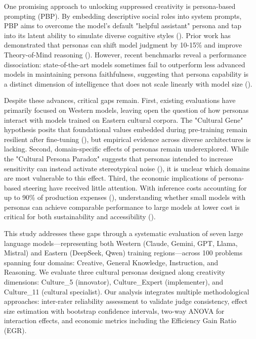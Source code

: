 \documentclass{article}
\begin{document}
One promising approach to unlocking suppressed creativity is persona-based prompting (PBP). By embedding descriptive social roles into system prompts, PBP aims to overcome the model's default "helpful assistant" persona and tap into its latent ability to simulate diverse cognitive styles (\cite{christina_lu_520bd0ae,jing_yang_699d9c2c}). Prior work has demonstrated that personas can shift model judgment by 10-15\% and improve Theory-of-Mind reasoning (\cite{tiancheng_hu_49571f40,gerard_yeo_2544df62}). However, recent benchmarks reveal a performance dissociation: state-of-the-art models sometimes fail to outperform less advanced models in maintaining persona faithfulness, suggesting that persona capability is a distinct dimension of intelligence that does not scale linearly with model size (\cite{vinay_samuel_301ec4c0}).

Despite these advances, critical gaps remain. First, existing evaluations have primarily focused on Western models, leaving open the question of how personas interact with models trained on Eastern cultural corpora. The "Cultural Gene" hypothesis posits that foundational values embedded during pre-training remain resilient after fine-tuning (\cite{emanuel_z__fenech_borg_a4a3e300}), but empirical evidence across diverse architectures is lacking. Second, domain-specific effects of personas remain underexplored. While the "Cultural Persona Paradox" suggests that personas intended to increase sensitivity can instead activate stereotypical noise (\cite{mahammed_kamruzzaman_a0ec385e, kharchenkoHowWellLLMs2024}), it is unclear which domains are most vulnerable to this effect. Third, the economic implications of persona-based steering have received little attention. With inference costs accounting for up to 90\% of production expenses (\cite{francisco_dur_n_a28bb68b}), understanding whether small models with personas can achieve comparable performance to large models at lower cost is critical for both sustainability and accessibility (\cite{anuj_kumar_1c38e9e4, jennifer_haase_36a334aa}).

This study addresses these gaps through a systematic evaluation of seven large language models—representing both Western (Claude, Gemini, GPT, Llama, Mistral) and Eastern (DeepSeek, Qwen) training regions—across 100 problems spanning four domains: Creative, General Knowledge, Instruction, and Reasoning. We evaluate three cultural personas designed along creativity dimensions: Culture\_5 (innovator), Culture\_Expert (implementer), and Culture\_11 (cultural specialist). Our analysis integrates multiple methodological approaches: inter-rater reliability assessment to validate judge consistency, effect size estimation with bootstrap confidence intervals, two-way ANOVA for interaction effects, and economic metrics including the Efficiency Gain Ratio (EGR).
\end{document}
